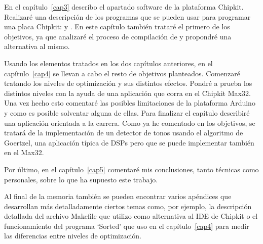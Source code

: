 En el capítulo~\ref{cap3} describo el apartado software de la plataforma Chipkit. Realizaré una descripción de los programas que se pueden usar para programar una placa Chipkit:  y . En este capítulo también trataré el primero de los objetivos, ya que analizaré el proceso de compilación de  y propondré una alternativa al mismo.

Usando los elementos tratados en los dos capítulos anteriores, en el capítulo~\ref{cap4} se llevan a cabo el resto de objetivos planteados. Comenzaré tratando los niveles de optimización y sus distintos efectos. Pondré a prueba los distintos niveles con la ayuda de una aplicación que corra en el Chipkit Max32. Una vez hecho esto comentaré las posibles limitaciones de la plataforma Arduino y como es posible solventar alguna de ellas. Para finalizar el capítulo describiré una aplicación orientada a la carrera. Como ya he comentado en los objetivos, se tratará de la implementación de un detector de tonos usando el algoritmo de Goertzel, una aplicación típica de DSPs pero que se puede implementar también en el Max32.

Por último, en el capítulo~\ref{cap5} comentaré mis conclusiones, tanto técnicas como personales, sobre lo que ha supuesto este trabajo.

Al final de la memoria también se pueden encontrar varios apéndices que desarrollan más detalladamente ciertos temas como, por ejemplo, la descripción detallada del archivo Makefile que utilizo como alternativa al IDE de Chipkit o el funcionamiento del programa `Sorted' que uso en el capítulo~\ref{cap4} para medir las diferencias entre niveles de optimización.
